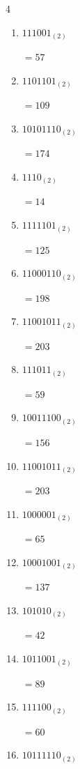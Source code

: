 \begin{multicols}{4}
\begin{enumerate}
        $=187$

  \item $111001_{(2)}$

        $=57$

  \item $1101101_{(2)}$

        $=109$

  \item $10101110_{(2)}$

        $=174$

  \item $1110_{(2)}$

        $=14$

  \item $1111101_{(2)}$

        $=125$

  \item $11000110_{(2)}$

        $=198$

  \item $11001011_{(2)}$

        $=203$

  \item $111011_{(2)}$

        $=59$

  \item $10011100_{(2)}$

        $=156$

\columnbreak %

\resetques

  \item $11001011_{(2)}$

        $=203$

  \item $1000001_{(2)}$

        $=65$

  \item $10001001_{(2)}$

        $=137$

  \item $101010_{(2)}$

        $=42$

  \item $1011001_{(2)}$

        $=89$

  \item $111100_{(2)}$

        $=60$

  \item $10111110_{(2)}$


\end{enumerate}
\end{multicols}
